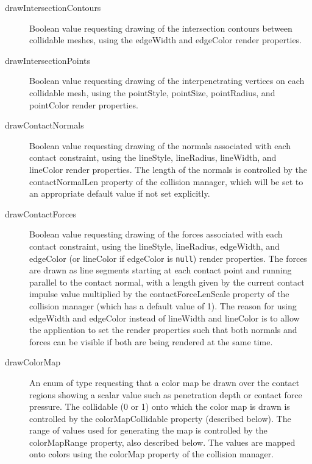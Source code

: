 \begin{description}

\item[drawIntersectionContours]\mbox{}

Boolean value requesting drawing of the intersection contours between
collidable meshes, using the {\sf edgeWidth} and {\sf edgeColor} render
properties.

\item[drawIntersectionPoints]\mbox{}

Boolean value requesting drawing of the interpenetrating vertices on
each collidable mesh, using the {\sf pointStyle}, {\sf pointSize}, {\sf
pointRadius}, and {\sf pointColor} render properties.

\item[drawContactNormals]\mbox{}

Boolean value requesting drawing of the normals associated with each
contact constraint, using the {\sf lineStyle}, {\sf lineRadius}, {\sf
lineWidth}, and {\sf lineColor} render properties. The length of the
normals is controlled by the {\sf contactNormalLen} property of the
collision manager, which will be set to an appropriate default value
if not set explicitly.

\item[drawContactForces]\mbox{}

Boolean value requesting drawing of the forces associated with each
contact constraint, using the {\sf lineStyle}, {\sf lineRadius}, {\sf
edgeWidth}, and {\sf edgeColor} (or {\sf lineColor} if {\sf edgeColor}
is {\tt null}) render properties.  The forces are drawn as line
segments starting at each contact point and running parallel to the
contact normal, with a length given by the current contact impulse
value multiplied by the {\sf contactForceLenScale} property of the
collision manager (which has a default value of 1).  The reason for
using {\sf edgeWidth} and {\sf edgeColor} instead of {\sf lineWidth}
and {\sf lineColor} is to allow the application to set the render
properties such that both normals and forces can be visible if both
are being rendered at the same time.

\item[drawColorMap]\mbox{}

An enum of type
requesting that a color map be drawn over the contact regions showing
a scalar value such as penetration depth or contact force pressure.
The collidable (0 or 1) onto which the color map is drawn is controlled by
the {\sf colorMapCollidable} property (described below). The range of values
used for generating the map is controlled by the {\sf colorMapRange}
property, also described below.  The values are mapped onto colors
using the {\sf colorMap} property of the collision manager.


\end{description}
